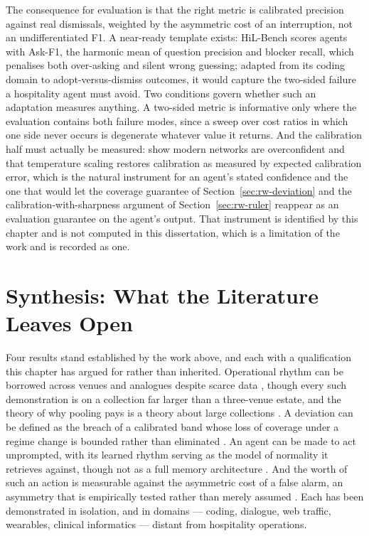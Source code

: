 The consequence for evaluation is that the right metric is calibrated precision
against real dismissals, weighted by the asymmetric cost of an interruption,
not an undifferentiated F1. A near-ready template exists: HiL-Bench
\citep[a 2026 preprint]{trinh_hil-bench_2026} scores agents with Ask-F1, the
harmonic mean of question precision and blocker recall, which penalises both
over-asking and silent wrong guessing; adapted from its coding domain to
adopt-versus-dismiss outcomes, it would capture the two-sided failure a
hospitality agent must avoid. Two conditions govern whether such an adaptation
measures anything. A two-sided metric is informative only where the evaluation
contains both failure modes, since a sweep over cost ratios in which one side
never occurs is degenerate whatever value it returns. And the calibration half
must actually be measured: \citet{guo_calibration_2017} show modern networks
are overconfident and that temperature scaling restores calibration as measured
by expected calibration error, which is the natural instrument for an agent's
stated confidence and the one that would let the coverage guarantee of
Section~\ref{sec:rw-deviation} and the calibration-with-sharpness argument of
Section~\ref{sec:rw-ruler} reappear as an evaluation guarantee on the agent's
output. That instrument is identified by this chapter and is not computed in
this dissertation, which is a limitation of the work and is recorded as one.

\section{Synthesis: What the Literature Leaves Open}
\label{sec:rw-synthesis}

Four results stand established by the work above, and each with a qualification
this chapter has argued for rather than inherited. Operational rhythm can be
borrowed across venues and analogues despite scarce data
\citep{das_-context_2025,zhou_context-driven_2025,liu_generative_2024}, though
every such demonstration is on a collection far larger than a three-venue
estate, and the theory of why pooling pays is a theory about large collections
\citep{montero-manso_principles_2021}. A deviation can be defined as the breach
of a calibrated band whose loss of coverage under a regime change is bounded
rather than eliminated
\citep{sun_conformal_2025,barber_conformal_2023,liu_elephant_2024}. An agent
can be made to act unprompted, with its learned rhythm serving as the model of
normality it retrieves against, though not as a full memory architecture
\citep{lu_proactive_2024,hu_memory_2026,park_generative_2023}. And the worth of
such an action is measurable against the asymmetric cost of a false alarm, an
asymmetry that is empirically tested rather than merely assumed
\citep{meyer_conceptual_2004,dixon_independence_2007,ancker_effects_2017,fu_prism_2026,trinh_hil-bench_2026}.
Each has been demonstrated in isolation, and in domains --- coding, dialogue,
web traffic, wearables, clinical informatics --- distant from hospitality
operations.

